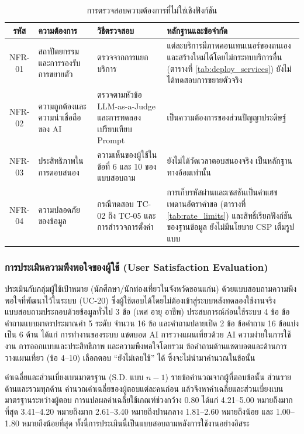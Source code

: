 \begin{table}[H]
\centering
\caption{การตรวจสอบความต้องการที่ไม่ใช่เชิงฟังก์ชัน}
\label{tab:nfr_verify}
\begin{tabular}{|c|p{3cm}|p{4.2cm}|p{4.6cm}|}
\hline
\textbf{รหัส} & \textbf{ความต้องการ} & \textbf{วิธีตรวจสอบ} & \textbf{หลักฐานและข้อจำกัด} \\
\hline
NFR-01 & สถาปัตยกรรมและการรองรับการขยายตัว & ตรวจจากการแยกบริการ & แต่ละบริการมีภาพคอนเทนเนอร์ของตนเองและสร้างใหม่ได้โดยไม่กระทบบริการอื่น (ตารางที่ \ref{tab:deploy_services}) ยังไม่ได้ทดสอบการขยายตัวจริง \\ \hline
NFR-02 & ความถูกต้องและความน่าเชื่อถือของ AI & ตรวจตามหัวข้อ LLM-as-a-Judge และการทดลองเปรียบเทียบ Prompt & เป็นความต้องการของส่วนปัญญาประดิษฐ์ \\ \hline
NFR-03 & ประสิทธิภาพในการตอบสนอง & ความเห็นของผู้ใช้ในข้อที่ 6 และ 10 ของแบบสอบถาม & ยังไม่ได้วัดเวลาตอบสนองจริง เป็นหลักฐานทางอ้อมเท่านั้น \\ \hline
NFR-04 & ความปลอดภัยของข้อมูล & กรณีทดสอบ TC-02 ถึง TC-05 และการสำรวจการตั้งค่า & การเก็บรหัสผ่านและเซสชันเป็นค่าแฮช เพดานอัตราคำขอ (ตารางที่ \ref{tab:rate_limits}) และสิทธิ์เรียกฟังก์ชันของฐานข้อมูล ยังไม่มีนโยบาย CSP เต็มรูปแบบ \\ \hline
\end{tabular}
\end{table}

\subsubsection{การประเมินความพึงพอใจของผู้ใช้ (User Satisfaction Evaluation)}

ประเมินกับกลุ่มผู้ใช้เป้าหมาย (นักศึกษา/นักท่องเที่ยวในจังหวัดขอนแก่น) ด้วยแบบสอบถามความพึงพอใจที่พัฒนาไว้ในระบบ (UC-20) ซึ่งผู้ใช้ตอบได้โดยไม่ต้องเข้าสู่ระบบหลังทดลองใช้งานจริง แบบสอบถามประกอบด้วยข้อมูลทั่วไป 3 ข้อ (เพศ อายุ อาชีพ) ประสบการณ์ก่อนใช้ระบบ 4 ข้อ ข้อคำถามแบบมาตรประมาณค่า 5 ระดับ จำนวน 16 ข้อ และคำถามปลายเปิด 2 ข้อ ข้อคำถาม 16 ข้อแบ่งเป็น 6 ด้าน ได้แก่ การทำงานของระบบ แชตบอต AI การวางแผนเที่ยวด้วย AI ความง่ายในการใช้งาน การออกแบบและประสิทธิภาพ และความพึงพอใจโดยรวม ข้อคำถามด้านแชตบอตและด้านการวางแผนเที่ยว (ข้อ 4--10) เลือกตอบ ``ยังไม่เคยใช้'' ได้ ซึ่งจะไม่นำมาคำนวณในข้อนั้น

ค่าเฉลี่ยและส่วนเบี่ยงเบนมาตรฐาน (S.D. แบบ $n-1$) รายข้อคำนวณจากผู้ที่ตอบข้อนั้น ส่วนรายด้านและรวมทุกด้าน คำนวณค่าเฉลี่ยของผู้ตอบแต่ละคนก่อน แล้วจึงหาค่าเฉลี่ยและส่วนเบี่ยงเบนมาตรฐานระหว่างผู้ตอบ การแปลผลค่าเฉลี่ยใช้เกณฑ์ช่วงกว้าง 0.80 \parencite{best1981} ได้แก่ 4.21--5.00 หมายถึงมากที่สุด 3.41--4.20 หมายถึงมาก 2.61--3.40 หมายถึงปานกลาง 1.81--2.60 หมายถึงน้อย และ 1.00--1.80 หมายถึงน้อยที่สุด ทั้งนี้การประเมินนี้เป็นแบบสอบถามหลังการใช้งานอย่างอิสระ

